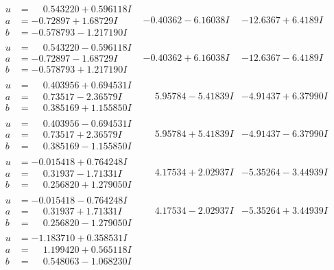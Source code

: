 \documentclass[1p]{elsarticle_modified}
\theoremstyle{definition}
\begin{document}
$$\begin{array}{c|c|c}
\begin{aligned}
u &= \phantom{-}0.543220 + 0.596118 I \\
a &= -0.72897 + 1.68729 I \\
b &= -0.578793 - 1.217190 I\end{aligned}
 & -0.40362 - 6.16038 I & -12.6367 + 6.4189 I \\ \hline\begin{aligned}
u &= \phantom{-}0.543220 - 0.596118 I \\
a &= -0.72897 - 1.68729 I \\
b &= -0.578793 + 1.217190 I\end{aligned}
 & -0.40362 + 6.16038 I & -12.6367 - 6.4189 I \\ \hline\begin{aligned}
u &= \phantom{-}0.403956 + 0.694531 I \\
a &= \phantom{-}0.73517 - 2.36579 I \\
b &= \phantom{-}0.385169 + 1.155850 I\end{aligned}
 & \phantom{-}5.95784 - 5.41839 I & -4.91437 + 6.37990 I \\ \hline\begin{aligned}
u &= \phantom{-}0.403956 - 0.694531 I \\
a &= \phantom{-}0.73517 + 2.36579 I \\
b &= \phantom{-}0.385169 - 1.155850 I\end{aligned}
 & \phantom{-}5.95784 + 5.41839 I & -4.91437 - 6.37990 I \\ \hline\begin{aligned}
u &= -0.015418 + 0.764248 I \\
a &= \phantom{-}0.31937 - 1.71331 I \\
b &= \phantom{-}0.256820 + 1.279050 I\end{aligned}
 & \phantom{-}4.17534 + 2.02937 I & -5.35264 - 3.44939 I \\ \hline\begin{aligned}
u &= -0.015418 - 0.764248 I \\
a &= \phantom{-}0.31937 + 1.71331 I \\
b &= \phantom{-}0.256820 - 1.279050 I\end{aligned}
 & \phantom{-}4.17534 - 2.02937 I & -5.35264 + 3.44939 I \\ \hline\begin{aligned}
u &= -1.183710 + 0.358531 I \\
a &= \phantom{-}1.199420 + 0.565118 I \\
b &= \phantom{-}0.548063 - 1.068230 I\end{aligned}

\end{array}$$
\end{document}
